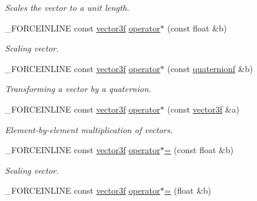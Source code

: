 \begin{DoxyCompactItemize}
\begin{DoxyCompactList}\small\item\em Scales the vector to a unit length. \end{DoxyCompactList}\item 
\hypertarget{classbt_1_1vector3f_aea84f4d255ddd24d8d8d66292fdfb424}{\-\_\-\-F\-O\-R\-C\-E\-I\-N\-L\-I\-N\-E const \hyperlink{classbt_1_1vector3f}{vector3f} \hyperlink{classbt_1_1vector3f_aea84f4d255ddd24d8d8d66292fdfb424}{operator$\ast$} (const float \&b)}\label{classbt_1_1vector3f_aea84f4d255ddd24d8d8d66292fdfb424}

\begin{DoxyCompactList}\small\item\em Scaling vector. \end{DoxyCompactList}\item 
\hypertarget{classbt_1_1vector3f_a7d65bad67c55b799afd19b81bafc7e6f}{\-\_\-\-F\-O\-R\-C\-E\-I\-N\-L\-I\-N\-E const \hyperlink{classbt_1_1vector3f}{vector3f} \hyperlink{classbt_1_1vector3f_a7d65bad67c55b799afd19b81bafc7e6f}{operator$\ast$} (const \hyperlink{classbt_1_1quaternionf}{quaternionf} \&b)}\label{classbt_1_1vector3f_a7d65bad67c55b799afd19b81bafc7e6f}

\begin{DoxyCompactList}\small\item\em Transforming a vector by a quaternion. \end{DoxyCompactList}\item 
\hypertarget{classbt_1_1vector3f_a1916e79bc513f5f3679d8180b90e2c4b}{\-\_\-\-F\-O\-R\-C\-E\-I\-N\-L\-I\-N\-E const \hyperlink{classbt_1_1vector3f}{vector3f} \hyperlink{classbt_1_1vector3f_a1916e79bc513f5f3679d8180b90e2c4b}{operator$\ast$} (const \hyperlink{classbt_1_1vector3f}{vector3f} \&a)}\label{classbt_1_1vector3f_a1916e79bc513f5f3679d8180b90e2c4b}

\begin{DoxyCompactList}\small\item\em Element-\/by-\/element multiplication of vectors. \end{DoxyCompactList}\item 
\hypertarget{classbt_1_1vector3f_ad7977da1d94e2ee1cac6e2e19f99a5ae}{\-\_\-\-F\-O\-R\-C\-E\-I\-N\-L\-I\-N\-E const \hyperlink{classbt_1_1vector3f}{vector3f} \hyperlink{classbt_1_1vector3f_ad7977da1d94e2ee1cac6e2e19f99a5ae}{operator$\ast$=} (const float \&b)}\label{classbt_1_1vector3f_ad7977da1d94e2ee1cac6e2e19f99a5ae}

\begin{DoxyCompactList}\small\item\em Scaling vector. \end{DoxyCompactList}\item 
\hypertarget{classbt_1_1vector3f_a7264911cad3fbe400b929b834f1cce48}{\-\_\-\-F\-O\-R\-C\-E\-I\-N\-L\-I\-N\-E const \hyperlink{classbt_1_1vector3f}{vector3f} \hyperlink{classbt_1_1vector3f_a7264911cad3fbe400b929b834f1cce48}{operator$\ast$=} (float \&b)}\label{classbt_1_1vector3f_a7264911cad3fbe400b929b834f1cce48}


\end{DoxyCompactItemize}
